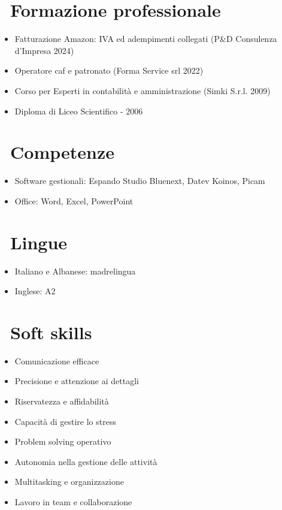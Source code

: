 \documentclass{resume}
\begin{document}
\section{\faInfo\ Formazione professionale}
\begin{itemize}[parsep=0.5ex]
 \item Fatturazione Amazon: IVA ed adempimenti collegati (P\&D Consulenza d'Impresa 2024)
 \item Operatore caf e patronato (Forma Service srl 2022)
 \item Corso per Esperti in contabilità e amministrazione (Simki S.r.l. 2009)
 \item Diploma di Liceo Scientifico - 2006
\end{itemize}

\section{\faCogs\ Competenze}
\begin{itemize}[parsep=0.5ex]
  \item Software gestionali: Espando Studio Bluenext, Datev Koinos, Picam
  \item Office: Word, Excel, PowerPoint
\end{itemize}

\section{\faInfo\ Lingue}
\begin{itemize}[parsep=0.5ex]
  \item Italiano e Albanese: madrelingua
  \item Inglese: A2
\end{itemize}

\section{\faUser\ Soft skills}
\begin{multicols}{2}
  \begin{itemize}[parsep=0.5ex]
    \item Comunicazione efficace
    \item Precisione e attenzione ai dettagli
    \item Riservatezza e affidabilità
    \item Capacità di gestire lo stress
    \item Problem solving operativo
    \item Autonomia nella gestione delle attività
    \item Multitasking e organizzazione
    \item Lavoro in team e collaborazione
   \end{itemize}
\end{multicols}
%
%
\end{document}
